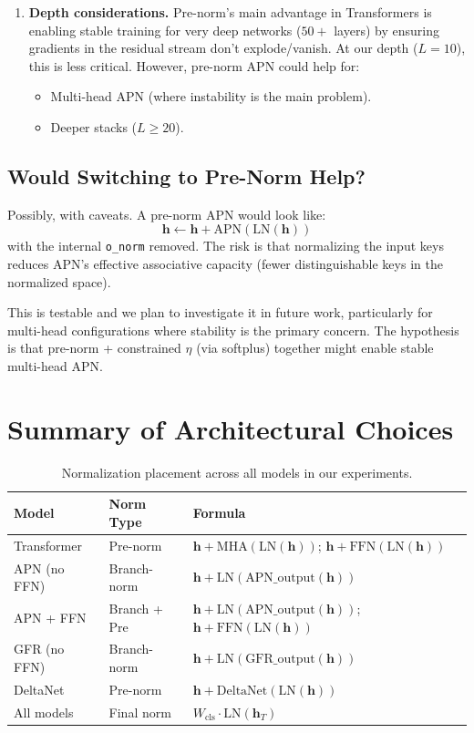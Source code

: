 \documentclass[11pt,a4paper]{article}
\begin{document}
\begin{enumerate}
\item \textbf{Depth considerations.}
Pre-norm's main advantage in Transformers is enabling stable training for very deep networks ($50{+}$ layers) by ensuring gradients in the residual stream don't explode/vanish.
At our depth ($L=10$), this is less critical.
However, pre-norm APN could help for:
\begin{itemize}
\item Multi-head APN (where instability is the main problem).
\item Deeper stacks ($L \geq 20$).
\end{itemize}
\end{enumerate}

\subsection{Would Switching to Pre-Norm Help?}

Possibly, with caveats. A pre-norm APN would look like:
\begin{equation}
\mathbf{h} \leftarrow \mathbf{h} + \text{APN}(\text{LN}(\mathbf{h}))
\end{equation}
with the internal \texttt{o\_norm} removed. The risk is that normalizing the input keys reduces APN's effective associative capacity (fewer distinguishable keys in the normalized space).

This is testable and we plan to investigate it in future work, particularly for multi-head configurations where stability is the primary concern. The hypothesis is that pre-norm + constrained $\eta$ (via softplus) together might enable stable multi-head APN.

\section{Summary of Architectural Choices}

\begin{table}[h]
\centering
\caption{Normalization placement across all models in our experiments.}
\begin{tabular}{lll}
\toprule
\textbf{Model} & \textbf{Norm Type} & \textbf{Formula} \\
\midrule
Transformer & Pre-norm & $\mathbf{h} + \text{MHA}(\text{LN}(\mathbf{h}))$; $\mathbf{h} + \text{FFN}(\text{LN}(\mathbf{h}))$ \\
APN (no FFN) & Branch-norm & $\mathbf{h} + \text{LN}(\text{APN\_output}(\mathbf{h}))$ \\
APN + FFN & Branch + Pre & $\mathbf{h} + \text{LN}(\text{APN\_output}(\mathbf{h}))$; $\mathbf{h} + \text{FFN}(\text{LN}(\mathbf{h}))$ \\
GFR (no FFN) & Branch-norm & $\mathbf{h} + \text{LN}(\text{GFR\_output}(\mathbf{h}))$ \\
DeltaNet & Pre-norm & $\mathbf{h} + \text{DeltaNet}(\text{LN}(\mathbf{h}))$ \\
\midrule
All models & Final norm & $W_{\text{cls}} \cdot \text{LN}(\mathbf{h}_T)$ \\
\bottomrule
\end{tabular}
\end{table}
\end{document}
